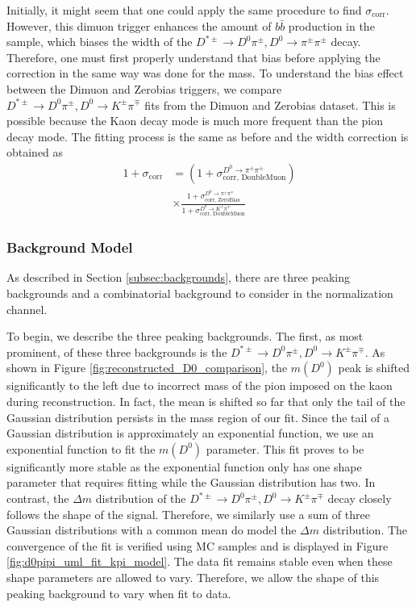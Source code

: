 Initially, it might seem that one could apply the same procedure to find $\sigma_{\text{corr}}$. However, this dimuon trigger enhances the amount of $b\bar{b}$ production in the sample, which biases the width of the $D^{*\pm}\to D^0 \pi^\pm, D^0 \to \pi^\pm \pi^\pm$ decay. Therefore, one must first properly understand that bias before applying the correction in the same way was done for the mass. To understand the bias effect between the Dimuon and Zerobias triggers, we compare $D^{*\pm}\to D^0 \pi^\pm, D^0 \to K^\pm \pi^\mp$ fits from the Dimuon and Zerobias dataset. This is possible because the Kaon decay mode is much more frequent than the pion decay mode. The fitting process is the same as before and the width correction 
is obtained as
\begin{equation}
    \begin{split}
        1+\sigma_{\text{corr}} &= \left(1+\sigma_{\text{corr, DoubleMuon}}^{D^0\to\pi^\pm\pi^\pm}\right) \\
        &\times \frac{
            1+\sigma_{\text{corr, ZeroBias}}^{D^0\to\pi^\pm\pi^\mp}
        }{
            1+\sigma_{\text{corr, DoubleMuon}}^{D^0\to K^\pm\pi^\mp}
        }
    \end{split}
\end{equation}    


\subsubsection{Background Model}

As described in Section \ref{subsec:backgrounds}, there are three peaking backgrounds and a combinatorial background to consider in the normalization channel. 

To begin, we describe the three peaking backgrounds. The first, as most prominent, of these three backgrounds is the $D^{*\pm} \to D^0\pi^\pm, D^0 \to K^\pm \pi^\mp$. As shown in Figure \ref{fig:reconstructed_D0_comparison}, the $m(D^0)$ peak is shifted significantly to the left due to incorrect mass of the pion imposed on the kaon during reconstruction. In fact, the mean is shifted so far that only the tail of the Gaussian distribution persists in the mass region of our fit. Since the tail of a Gaussian distribution is approximately an exponential function, we use an exponential function to fit the $m(D^0)$ parameter. This fit proves to be significantly more stable as the exponential function only has one shape parameter that requires fitting while the Gaussian distribution has two. In contrast, the $\Delta m$ distribution of the $D^{*\pm} \to D^0\pi^\pm, D^0 \to K^\pm \pi^\mp$ decay closely follows the shape of the signal. Therefore, we similarly use a sum of three Gaussian distributions with a common mean do model the $\Delta m$ distribution. The convergence of the fit is verified using MC samples and is displayed in Figure \ref{fig:d0pipi_uml_fit_kpi_model}. The data fit remains stable even when these shape parameters are allowed to vary. Therefore, we allow the shape of this peaking background to vary when fit to data. 

